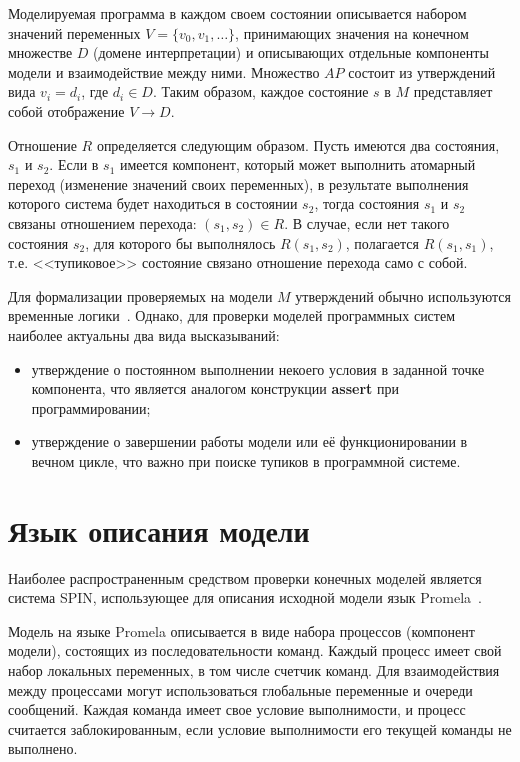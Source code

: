 \documentclass[12pt,a4paper,fleqn]{article}
\begin{document}
Моделируемая программа в каждом своем состоянии описывается набором значений переменных $V = \{v_0, v_1, \ldots\}$, принимающих значения на конечном множестве $D$ (домене интерпретации) и описывающих отдельные компоненты модели и взаимодействие между ними.
Множество $AP$ состоит из утверждений вида $v_i = d_i$, где $d_i \in D$.
Таким образом, каждое состояние $s$ в $M$ представляет собой отображение $V \rightarrow D$.

Отношение $R$ определяется следующим образом. Пусть имеются два состояния, $s_1$ и $s_2$. Если в $s_1$ имеется
компонент, который может выполнить атомарный переход (изменение значений своих переменных), в результате выполнения
которого система будет находиться в состоянии $s_2$, тогда состояния $s_1$ и $s_2$ связаны отношением перехода: $(s_1,
s_2) \in R$. В случае, если нет такого состояния $s_2$, для которого бы выполнялось $R(s_1, s_2)$, полагается $R(s_1,
s_1)$, т.е. <<тупиковое>> состояние связано отношение перехода само с собой.

Для формализации проверяемых на модели $M$ утверждений обычно используются временные логики~\cite{Clarke}.
Однако, для проверки моделей программных систем наиболее актуальны два вида высказываний:
\begin{itemize}
\item утверждение о постоянном выполнении некоего условия в заданной точке компонента, что является аналогом конструкции \textbf{assert} при программировании;
\item утверждение о завершении работы модели или её функционировании в вечном цикле, что важно при поиске тупиков в программной системе.
\end{itemize}

\section{Язык описания модели}
\label{sec:spin}

Наиболее распространенным средством проверки конечных моделей является система SPIN, использующее для описания исходной
модели язык Promela~\cite{SPIN}.

Модель на языке Promela описывается в виде набора процессов (компонент модели), состоящих из последовательности команд.
Каждый процесс имеет свой набор локальных переменных, в том числе счетчик команд.
Для взаимодействия между процессами могут использоваться глобальные переменные и очереди сообщений.
Каждая команда имеет свое условие выполнимости, и процесс считается заблокированным, если условие выполнимости его текущей команды не выполнено.
\end{document}

